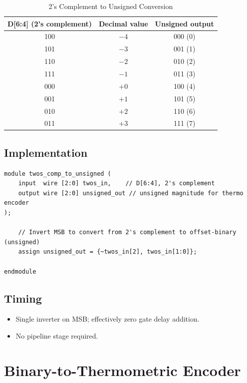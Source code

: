 \documentclass[11pt,a4paper]{article}
\begin{document}
\begin{table}[h]
\centering
\begin{tabular}{@{}ccc@{}}
\toprule
\textbf{D[6:4] (2's complement)} & \textbf{Decimal value} & \textbf{Unsigned output} \\
\midrule
100 & $-4$ & 000 (0) \\
101 & $-3$ & 001 (1) \\
110 & $-2$ & 010 (2) \\
111 & $-1$ & 011 (3) \\
000 & $+0$ & 100 (4) \\
001 & $+1$ & 101 (5) \\
010 & $+2$ & 110 (6) \\
011 & $+3$ & 111 (7) \\
\bottomrule
\end{tabular}
\caption{2's Complement to Unsigned Conversion}
\end{table}

\subsection{Implementation}

\begin{lstlisting}[caption={2's Complement to Unsigned Converter}]
module twos_comp_to_unsigned (
    input  wire [2:0] twos_in,    // D[6:4], 2's complement
    output wire [2:0] unsigned_out // unsigned magnitude for thermo encoder
);

    // Invert MSB to convert from 2's complement to offset-binary (unsigned)
    assign unsigned_out = {~twos_in[2], twos_in[1:0]};

endmodule
\end{lstlisting}

\subsection{Timing}

\begin{itemize}
    \item Single inverter on MSB; effectively zero gate delay addition.
    \item No pipeline stage required.
\end{itemize}

\section{Binary-to-Thermometric Encoder}
\end{document}
